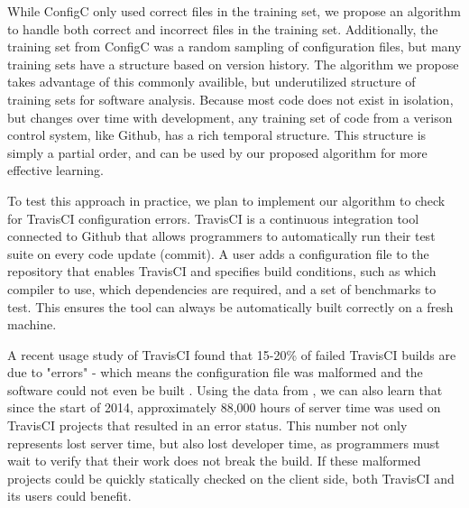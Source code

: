 While ConfigC only used correct files in the training set, we propose an algorithm to handle both correct and incorrect files in the training set.
Additionally, the training set from ConfigC was a random sampling of configuration files, but many training sets have a structure based on version history.
The algorithm we propose takes advantage of this commonly availible, but underutilized structure of training sets for software analysis.
Because most code does not exist in isolation, but changes over time with development, any training set of code from a verison control system, like Github, has a rich temporal structure. 
This structure is simply a partial order, and can be used by our proposed algorithm for more effective learning.

To test this approach in practice, we plan to implement our algorithm to check for TravisCI configuration errors.
TravisCI is a continuous integration tool connected to Github that allows programmers to automatically run their test suite on every code update (commit).
A user adds a configuration file to the repository that enables TravisCI and specifies build conditions, such as which compiler to use, which dependencies are required, and a set of benchmarks to test.
This ensures the tool can always be automatically built correctly on a fresh machine.

A recent usage study of TravisCI found that 15-20\% of failed TravisCI builds are due to "errors" - which means the configuration file was malformed and the software could not even be built \cite{API}.
Using the data from \cite{API}, we can also learn that since the start of 2014, approximately 88,000 hours of server time was used on TravisCI projects that resulted in an error status.
This number not only represents lost server time, but also lost developer time, as programmers must wait to verify that their work does not break the build.
If these malformed projects could be quickly statically checked on the client side, both TravisCI and its users could benefit.
